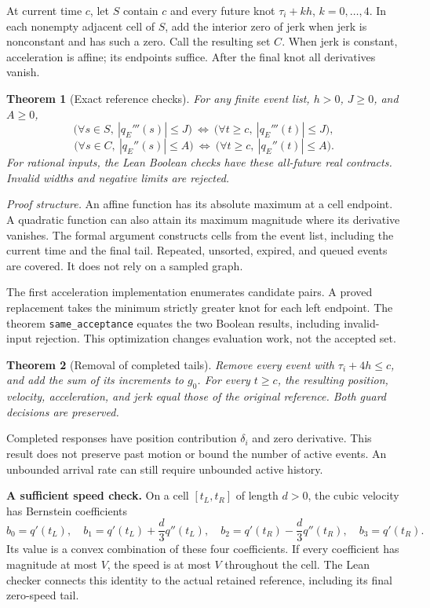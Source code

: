 \documentclass[10pt,letterpaper]{article}
\newtheorem{theorem}{Theorem}
\begin{document}
At current time $c$, let $S$ contain $c$ and every future knot $\tau_i+kh$,
$k=0,\ldots,4$. In each nonempty adjacent cell of $S$, add the interior zero of
jerk when jerk is nonconstant and has such a zero. Call the resulting set $C$.
When jerk is constant, acceleration is affine; its endpoints suffice. After
the final knot all derivatives vanish.

\begin{theorem}[Exact reference checks]\label{thm:checks}
For any finite event list, $h>0$, $J\geq0$, and $A\geq0$,
\[
 \bigl(\forall s\in S,\ |q_E'''(s)|\leq J\bigr)
 \ \Longleftrightarrow\
 \bigl(\forall t\geq c,\ |q_E'''(t)|\leq J\bigr),
\]
\[
 \bigl(\forall s\in C,\ |q_E''(s)|\leq A\bigr)
 \ \Longleftrightarrow\
 \bigl(\forall t\geq c,\ |q_E''(t)|\leq A\bigr).
\]
For rational inputs, the Lean Boolean checks have these all-future real
contracts. Invalid widths and negative limits are rejected.
\end{theorem}
\textit{Proof structure.} An affine function has its absolute maximum at a cell
endpoint. A quadratic function can also attain its maximum magnitude where its
derivative vanishes. The formal argument constructs cells from the event list,
including the current time and the final tail. Repeated, unsorted, expired, and
queued events are covered. It does not rely on a sampled graph.

The first acceleration implementation enumerates candidate pairs. A proved
replacement takes the minimum strictly greater knot for each left endpoint.
The theorem \texttt{same\_acceptance} equates the two Boolean results, including
invalid-input rejection. This optimization changes evaluation work, not the
accepted set.

\begin{theorem}[Removal of completed tails]\label{thm:prune}
Remove every event with $\tau_i+4h\leq c$, and add the sum of its increments to
$g_0$. For every $t\geq c$, the resulting position, velocity, acceleration, and
jerk equal those of the original reference. Both guard decisions are preserved.
\end{theorem}
Completed responses have position contribution $\delta_i$ and zero derivative.
This result does not preserve past motion or bound the number of active events.
An unbounded arrival rate can still require unbounded active history.

\textbf{A sufficient speed check.}
On a cell $[t_L,t_R]$ of length $d>0$, the cubic velocity has Bernstein
coefficients
\[
 b_0=q'(t_L),\quad b_1=q'(t_L)+\frac d3 q''(t_L),\quad
 b_2=q'(t_R)-\frac d3 q''(t_R),\quad b_3=q'(t_R).
\]
Its value is a convex combination of these four coefficients. If every
coefficient has magnitude at most $V$, the speed is at most $V$ throughout
the cell. The Lean checker connects this identity to the actual retained
reference, including its final zero-speed tail.
\end{document}

